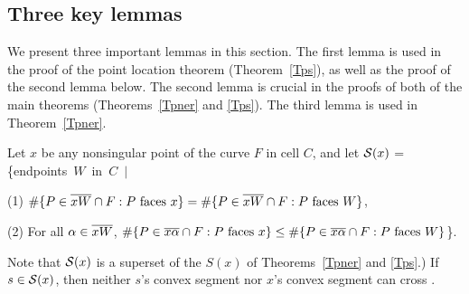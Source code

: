
\subsection{Three key lemmas}

We present three important lemmas in this section.
The first lemma is used in the proof of the point location 
theorem (Theorem~\ref{Tps}),
as well as the proof of the second lemma below.
The second lemma is crucial in the proofs of both of the main theorems 
(Theorems~\ref{Tpner} and \ref{Tps}).
The third lemma is used in Theorem~\ref{Tpner}.

\begin{lemma}
\label{lem-argh}
Let $x$ be any nonsingular point of the curve $F$ in cell $C$, and
let ${\cal S}(x)$ = \mbox{\{endpoints $W$ in $C$ $\mid$}

{\rm (1)} \mbox{$\#\{P \in\mbox{$\overline{xW}$}\cap F: P \mbox{ faces $x$}\} =
\#\{P \in \mbox{$\overline{xW}$}\cap F: P \mbox{ faces $W$} \}$},

{\rm (2)} For all $\alpha \in \mbox{$\overline{xW}$}$,
$\#\{P \in\mbox{$\overline{x\alpha}$}\cap F: P \mbox{ faces $x$}\} \leq
\#\{P \in \mbox{$\overline{x\alpha}$}\cap F: P \mbox{ faces $W$}\} $\}.

\vspace{.05in}

\noindent {\rm (}Note that 
${\cal S}(x)$ is a superset of the $S(x)$ of Theorems~{\rm \ref{Tpner}} 
and {\rm \ref{Tps}.)}
If $s \in {\cal S}(x)$, then neither $s$'s convex segment nor $x$'s convex 
segment can cross .
\end{lemma}

